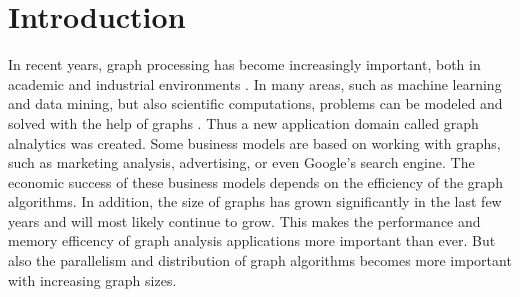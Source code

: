 \section{Introduction}

In recent years, graph processing has become increasingly important, both in academic and industrial environments \cite{Gemini}.
In many areas, such as machine learning and data mining, but also scientific computations, problems can be modeled and solved with the help of graphs \cite{Polymer}.
Thus a new application domain called graph alnalytics was created.
Some business models are based on working with graphs, such as marketing analysis, advertising, or even Google's search engine.
The economic success of these business models depends on the efficiency of the graph algorithms.
In addition, the size of graphs has grown significantly in the last few years and will most likely continue to grow.
This makes the performance and memory efficency of graph analysis applications more important than ever.
But also the parallelism and distribution of graph algorithms becomes more important with increasing graph sizes.

